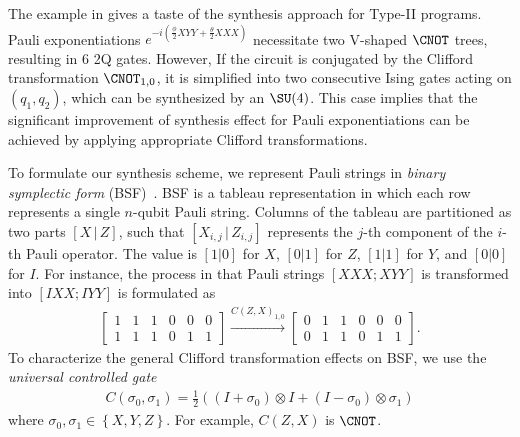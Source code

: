 The example in  gives a taste of the synthesis approach for Type-II programs. Pauli exponentiations $ e^{-i (\frac{\phi}{2}XYY + \frac{\theta}{2}XXX)} $ necessitate two V-shaped $\CNOT$ trees, resulting in 6 2Q gates. However, If the circuit is conjugated by the Clifford transformation $ \CNOT_{1,0} $, it is simplified into two consecutive Ising gates acting on $(q_1, q_2)$, which can be synthesized by an $ \SU(4) $. This case implies that the significant improvement of synthesis effect for Pauli exponentiations can be achieved by applying appropriate Clifford transformations.


To formulate our synthesis scheme, %
we represent Pauli strings in \textit{binary symplectic form} (BSF)~\cite{van2020circuit}. BSF is a tableau representation in which each row represents a single $ n $-qubit Pauli string. Columns of the tableau are partitioned as two parts $ [X\,|\,Z] $, such that $ [X_{i,j}\,|\, Z_{i,j}] $ represents the $ j $-th component of the $ i $-th Pauli operator. The value is $ [1 | 0 ] $ for $ X $, $ [0 | 1 ] $ for $ Z $, $ [1 | 1 ] $ for $ Y $, and $ [0 | 0 ] $ for $ I $. For instance, the process in that Pauli strings $ [XXX; XYY] $ is transformed into $ [IXX; IYY] $ is formulated as 
\begin{align*}
    \left[
        \begin{array}{ccc|ccc}
        1 & 1 & 1 & 0 & 0 & 0 \\
        1 & 1 & 1 & 0 & 1 & 1
        \end{array}
    \right]
    \xrightarrow{C(Z,X)_{1,0}}
    \left[
        \begin{array}{ccc|ccc}
            0 & 1 & 1 & 0 & 0 & 0 \\
            0 & 1 & 1 & 0 & 1 & 1
        \end{array}
    \right].
\end{align*}
To characterize the general Clifford transformation effects on BSF, we use the \textit{universal controlled gate} 
\begin{align}
    C(\sigma_0, \sigma_1) = \frac{1}{2}((I + \sigma_0)\otimes I + (I - \sigma_0)\otimes \sigma_1)
\end{align}
where $ \sigma_0,\sigma_1\in \left\{X,Y,Z\right\} $. For example, $C(Z,X)$ is $\CNOT$.

